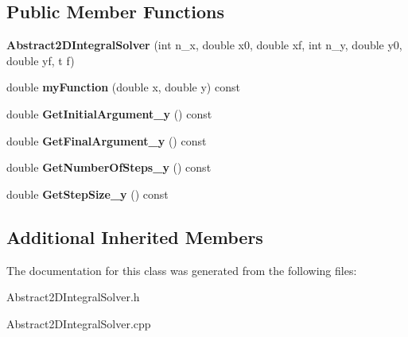\subsection*{Public Member Functions}
\begin{DoxyCompactItemize}
\item 
\mbox{\label{class_abstract2_d_integral_solver_ad25b34f07befbbad7d3ec2b76d47b2b7}} 
{\bfseries Abstract2\+D\+Integral\+Solver} (int n\+\_\+x, double x0, double xf, int n\+\_\+y, double y0, double yf, t f)
\item 
\mbox{\label{class_abstract2_d_integral_solver_a61ef8c068db67dd7a0c3e8b24752a299}} 
double {\bfseries my\+Function} (double x, double y) const
\item 
\mbox{\label{class_abstract2_d_integral_solver_a337907e938e5aa286618fd582b7b304e}} 
double {\bfseries Get\+Initial\+Argument\+\_\+y} () const
\item 
\mbox{\label{class_abstract2_d_integral_solver_ab4a24610598fa26556c60c449d757b65}} 
double {\bfseries Get\+Final\+Argument\+\_\+y} () const
\item 
\mbox{\label{class_abstract2_d_integral_solver_ad82316695f57ad589714598617c7784d}} 
double {\bfseries Get\+Number\+Of\+Steps\+\_\+y} () const
\item 
\mbox{\label{class_abstract2_d_integral_solver_a5c23a838a4db9b607140d4d5f03b4f79}} 
double {\bfseries Get\+Step\+Size\+\_\+y} () const
\end{DoxyCompactItemize}
\subsection*{Additional Inherited Members}


The documentation for this class was generated from the following files\+:\begin{DoxyCompactItemize}
\item 
Abstract2\+D\+Integral\+Solver.\+h\item 
Abstract2\+D\+Integral\+Solver.\+cpp\end{DoxyCompactItemize}
